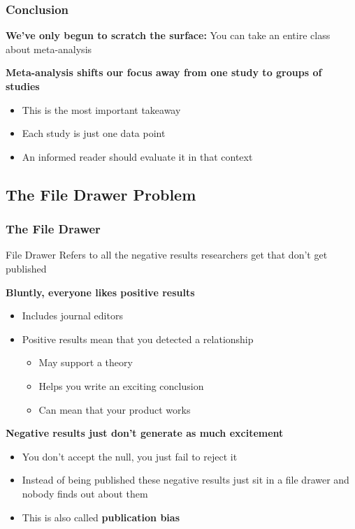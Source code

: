 \documentclass[10pt, block=fill]{beamer}
\begin{document}
\begin{frame}
    \frametitle{Conclusion}
    
    \textbf{We've only begun to scratch the surface:} You can take an entire class about meta-analysis
    
    \vspace{0.25in}
    
    \textbf{Meta-analysis shifts our focus away from one study to groups of studies}
    \begin{itemize}
        \item This is the most important takeaway
        \item Each study is just one data point
        \item An informed reader should evaluate it in that context
    \end{itemize}
\end{frame}



\subsection{The File Drawer Problem}

\begin{frame}
    \frametitle{The File Drawer}
    
    \begin{block}{File Drawer}
        Refers to all the negative results researchers get that don't get published
    \end{block}
    
    \textbf{Bluntly, everyone likes positive results}
    \begin{itemize}
        \item Includes journal editors
        \item Positive results mean that you detected a relationship
        \begin{itemize}
            \item May support a theory
            \item Helps you write an exciting conclusion
            \item Can mean that your product works
        \end{itemize}
    \end{itemize}
    
    \textbf{Negative results just don't generate as much excitement}
    \begin{itemize}
        \item You don't accept the null, you just fail to reject it
        \item Instead of being published these negative results just sit in a file drawer and nobody finds out about them
        \item This is also called \textbf{publication bias}
    \end{itemize}
\end{frame}
\end{document}
